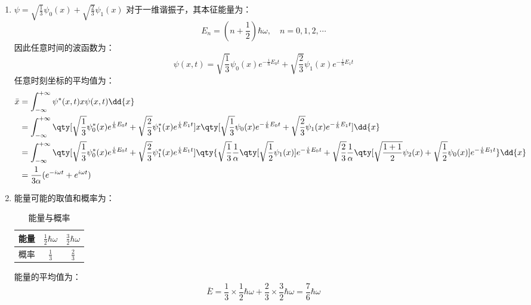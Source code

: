 \subsection{ }
\begin{enumerate}
\item $\psi=\sqrt{\frac{1}{3}}\psi_{0}(x)+\sqrt{\frac{2}{3}}\psi_{1}(x)$
对于一维谐振子，其本征能量为：
\begin{equation}
E_{n}=(n+\frac{1}{2})\hbar \omega,\quad n=0,1,2,\cdots
\end{equation}
因此任意时间的波函数为：
\begin{equation}
\psi(x,t)=\sqrt{\frac{1}{3}}\psi_{0}(x)e^{-\frac{i}{\hbar}E_{0}t}+\sqrt{\frac{2}{3}}\psi_{1}(x)e^{-\frac{i}{\hbar}E_{1}t}
\end{equation}
任意时刻坐标的平均值为：
\begin{equation}
\begin{aligned}
\bar{x}&=\int^{+\infty}_{-\infty}\psi^{*}(x,t)x\psi(x,t)\dd{x} \\
&=\int^{+\infty}_{-\infty} \qty[\sqrt{\frac{1}{3}}\psi^{*}_{0}(x)e^{\frac{i}{\hbar}E_{0}t}+\sqrt{\frac{2}{3}}\psi^{*}_{1}(x)e^{\frac{i}{\hbar}E_{1}t}]x\qty[\sqrt{\frac{1}{3}}\psi_{0}(x)e^{-\frac{i}{\hbar}E_{0}t}+\sqrt{\frac{2}{3}}\psi_{1}(x)e^{-\frac{i}{\hbar}E_{1}t}]\dd{x} \\
&=\int^{+\infty}_{-\infty} \qty[\sqrt{\frac{1}{3}}\psi^{*}_{0}(x)e^{\frac{i}{\hbar}E_{0}t}+\sqrt{\frac{2}{3}}\psi^{*}_{1}(x)e^{\frac{i}{\hbar}E_{1}t}]\qty{\sqrt{\frac{1}{3}}\frac{1}{\alpha}\qty[\sqrt{\frac{1}{2}}\psi_{1}(x)]e^{-\frac{i}{\hbar}E_{0}t}+\sqrt{\frac{2}{3}}\frac{1}{\alpha}\qty[\sqrt{\frac{1+1}{2}}\psi_{2}(x)+\sqrt{\frac{1}{2}}\psi_{0}(x)]e^{-\frac{i}{\hbar}E_{1}t}}\dd{x} \\
&=\frac{1}{3\alpha}(e^{-i\omega t}+e^{i\omega t})
\end{aligned}
\end{equation}

\item 能量可能的取值和概率为：
\begin{table}[ht]
\centering
\caption{能量与概率}\label{TJU14A_tab2}
\begin{tabular}{|c|c|c|}
\hline
能量 & $\frac{1}{2}\hbar\omega$ & $\frac{3}{2}\hbar\omega$ \\
\hline
概率 & $\frac{1}{3}$ & $\frac{2}{3}$ \\
\hline
\end{tabular}
\end{table}
能量的平均值为：
\begin{equation}
\bar{E}=\frac{1}{3}\times \frac{1}{2}\hbar\omega + \frac{2}{3}\times \frac{3}{2}\hbar\omega=\frac{7}{6}\hbar\omega
\end{equation}
\end{enumerate}
